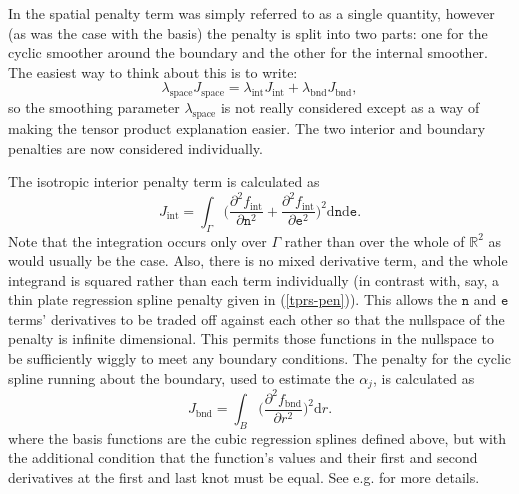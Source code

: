 In  the spatial penalty term was simply referred to as a single quantity, however (as was the case with the basis) the penalty is split into two parts: one for the cyclic smoother around the boundary and the other for the internal smoother. The easiest way to think about this is to write:
\begin{equation*}
\lambda_\text{space} J_\text{space} = \lambda_\text{int} J_\text{int} + \lambda_\text{bnd} J_\text{bnd},
\end{equation*}
so the smoothing parameter $\lambda_\text{space}$ is not really considered except as a way of making the tensor product explanation easier. The two interior and boundary penalties are now considered individually.


The isotropic interior penalty term is calculated as
$$
J_\text{int} = \int_\Gamma \Big(\frac{\partial^2 f_\text{int}}{\partial \texttt{n}^2}+\frac{\partial^2 f_\text{int}}{\partial \texttt{e}^2} 
\Big)^2\text{d}\texttt{n}\text{d}\texttt{e}.
$$
Note that the integration occurs only over $\Gamma$ rather than over the whole of $\mathbb{R}^2$ as would usually be the case. Also, there is no mixed derivative term, and the whole integrand is squared rather than each term individually (in contrast with, say, a thin plate regression spline penalty given in (\ref{tprs-pen})). This allows the $\texttt{n}$ and $\texttt{e}$ terms' derivatives to be traded off against each other so that the nullspace of the penalty is infinite dimensional. This permits those functions in the nullspace to be sufficiently wiggly to meet any boundary conditions. The penalty for the cyclic spline running about the boundary, used to estimate the $\alpha_j$, is calculated as 
$$
J_\text{bnd} = \int_B \Big(\frac{\partial^2 f_\text{bnd}}{\partial r^2}\Big)^2 \text{d}r.
$$
where the basis functions are the cubic regression splines defined above, but with the additional condition that the function's values and their first and second derivatives at the first and last knot must be equal. See e.g. \cite[p. 149]{simonbook} for more details.


